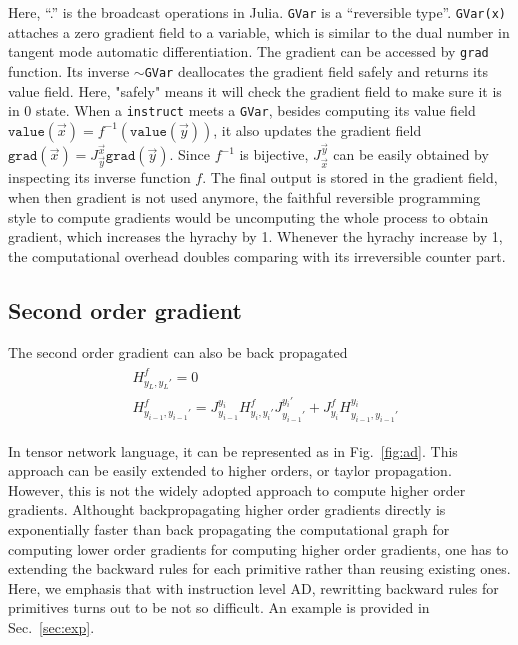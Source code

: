 \documentclass[aps,twocolumn,longbibliography,english,superscriptaddress,prr]{revtex4-1}
\newcommand{\<}{\langle}
\renewcommand{\>}{\rangle}
\newcommand{\vx}{{\vec x}}
\newcommand{\vy}{{\vec y}}
\newcommand{\vvalue}{{\texttt{value}}}
\newcommand{\grad}{{\texttt{grad}}}
\newcommand{\Fig}[1]{Fig.~\ref{#1}}
\newcommand{\Sec}[1]{Sec.~\ref{#1}}
\theoremstyle{definition}\newtheorem{definition}{\textit{Definition}}
\begin{document}
Here, ``.'' is the broadcast operations in Julia. \texttt{GVar} is a ``reversible type''. \texttt{GVar(x)} attaches a zero gradient field to a variable, which is similar to the dual number in tangent mode automatic differentiation. The gradient can be accessed by \texttt{grad} function. Its inverse \texttt{$\sim$GVar} deallocates the gradient field safely and returns its value field. Here, "safely" means it will check the gradient field to make sure it is in $0$ state.
When a \texttt{instruct} meets a \texttt{GVar}, besides computing its value field $\vvalue(\vx) = f^{-1}(\vvalue(\vy))$, it also updates the gradient field $\grad(\vx) = J^{\vx}_{\vy} \grad(\vy)$. Since $f^{-1}$ is bijective, $J^\vy_\vx$ can be easily obtained by inspecting its inverse function $f$.
The final output is stored in the gradient field, when then gradient is not used anymore, the faithful reversible programming style to compute gradients would be uncomputing the whole process to obtain gradient, which increases the hyrachy by 1. Whenever the hyrachy increase by 1, the computational overhead doubles comparing with its irreversible counter part.

\subsection{Second order gradient}
The second order gradient can also be back propagated
\begin{align}
    \begin{split}
        &H^f_{y_L,y_L'} = 0\\
        &H^f_{y_{i-1},y_{i-1}'} = J^{y_i}_{y_{i-1}} H^f_{y_i, y_i'} J^{y_i'}_{y_{i-1}'} + J^f_{y_i} H^{y_i}_{y_{i-1}, y_{i-1}'}
    \end{split}
\end{align}

In tensor network language, it can be represented as in \Fig{fig:ad}.
This approach can be easily extended to higher orders, or taylor propagation.
However, this is not the widely adopted approach to compute higher order gradients.
Althought backpropagating higher order gradients directly is exponentially faster than back propagating the computational graph for computing lower order gradients for computing higher order gradients, one has to extending the backward rules for each primitive rather than reusing existing ones.
Here, we emphasis that with instruction level AD, rewritting backward rules for primitives turns out to be not so difficult.
An example is provided in \Sec{sec:exp}.
\end{document}
